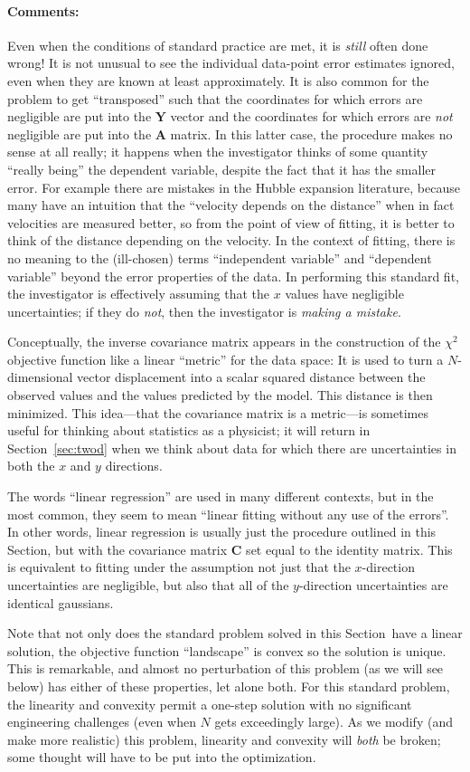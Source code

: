 \documentclass[12pt,twoside]{article}
\newcommand{\sectionname}{Section}
\newcommand{\commentsname}{Comments}
\newcounter{problem}
\newenvironment{comments}{\paragraph{\commentsname:}}{}
\newcommand{\mmatrix}[1]{\boldsymbol{#1}}
\newcommand{\mA}{\mmatrix{A}}
\newcommand{\mC}{\mmatrix{C}}
\newcommand{\mY}{\mmatrix{Y}}
\begin{document}
\begin{comments}
Even when the conditions of standard practice are met, it is
\emph{still} often done wrong!  It is not unusual to see the
individual data-point error estimates ignored, even when they are
known at least approximately.  It is also common for the problem to
get ``transposed'' such that the coordinates for which errors are
negligible are put into the $\mY$ vector and the coordinates for which
errors are \emph{not} negligible are put into the $\mA$ matrix.  In
this latter case, the procedure makes no sense at all really; it
happens when the investigator thinks of some quantity ``really being''
the dependent variable, despite the fact that it has the smaller
error.  For example there are mistakes in the Hubble expansion
literature, because many have an intuition that the ``velocity depends
on the distance'' when in fact velocities are measured better, so from
the point of view of fitting, it is better to think of the distance
depending on the velocity.  In the context of fitting, there is no
meaning to the (ill-chosen) terms ``independent variable'' and ``dependent
variable'' beyond the error properties of the data.  In performing
this standard fit, the investigator is effectively assuming that the
$x$ values have negligible uncertainties; if they do \emph{not}, then
the investigator is \emph{making a mistake}.

Conceptually, the inverse covariance matrix appears in the
construction of the $\chi^2$ objective function like a linear
``metric'' for the data space: It is used to turn a $N$-dimensional
vector displacement into a scalar squared distance between the
observed values and the values predicted by the model. This distance
is then minimized.  This idea---that the covariance matrix is a
metric---is sometimes useful for thinking about statistics as a
physicist; it will return in \sectionname~\ref{sec:twod} when we think
about data for which there are uncertainties in both the $x$ and $y$
directions.

The words ``linear regression'' are used in many different contexts,
but in the most common, they seem to mean ``linear fitting without any
use of the errors''.  In other words, linear regression is usually
just the procedure outlined in this \sectionname, but with the
covariance matrix $\mC$ set equal to the identity matrix.  This is
equivalent to fitting under the assumption not just that the
$x$-direction uncertainties are negligible, but also that all of the
$y$-direction uncertainties are identical gaussians.

Note that not only does the standard problem solved in this
\sectionname\ have a linear solution, the objective function
``landscape'' is convex so the solution is unique.  This is
remarkable, and almost no perturbation of this problem (as we will see
below) has either of these properties, let alone both.  For this
standard problem, the linearity and convexity permit a one-step
solution with no significant engineering challenges (even when $N$
gets exceedingly large).  As we modify (and make more realistic) this
problem, linearity and convexity will \emph{both} be broken; some
thought will have to be put into the optimization.
\end{comments}
\end{document}
